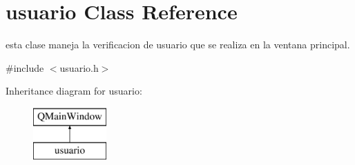 \hypertarget{classusuario}{}\section{usuario Class Reference}
\label{classusuario}


esta clase maneja la verificacion de usuario que se realiza en la ventana principal.  




{\ttfamily \#include $<$usuario.\+h$>$}

Inheritance diagram for usuario\+:\begin{figure}[H]
\begin{center}
\leavevmode
\includegraphics[height=2.000000cm]{classusuario}
\end{center}
\end{figure}

